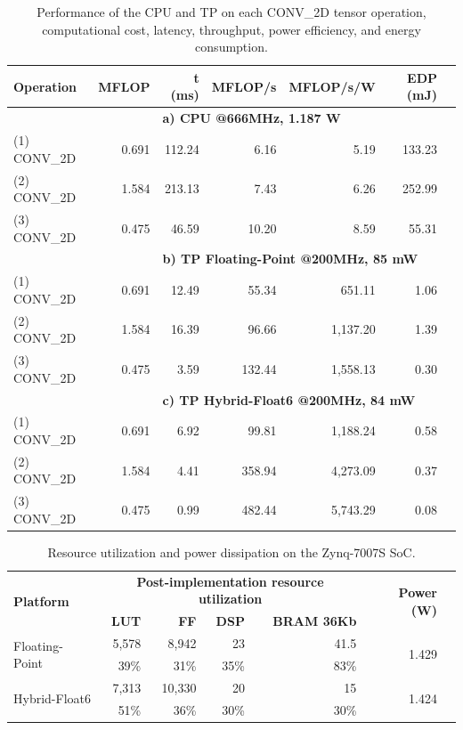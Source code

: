 \begin{table}[!htp]\centering
	\caption{Performance of the CPU and TP on each CONV\_2D tensor operation, computational cost, latency, throughput, power efficiency, and energy consumption.}\label{tab:performance}
	\scriptsize
	\begin{tabular}{lrrrrrr}\toprule
		\textbf{Operation} &\textbf{MFLOP} &\textbf{t (ms)} &\textbf{MFLOP/s} &\textbf{MFLOP/s/W} &\textbf{EDP (mJ)} \\\midrule
		& &\multicolumn{4}{l}{\textbf{a) CPU @666MHz, 1.187 W}} \\
		(1) CONV\_2D &0.691 &112.24 &6.16 &5.19 &133.23 \\
		(2) CONV\_2D &1.584 &213.13 &7.43 &6.26 &252.99 \\
		(3) CONV\_2D &0.475 &46.59 &10.20 &8.59 &55.31 \\
		& &\multicolumn{4}{l}{\textbf{b) TP Floating-Point @200MHz, 85 mW}} \\
		(1) CONV\_2D &0.691 &12.49 &55.34 &651.11 &1.06 \\
		(2) CONV\_2D &1.584 &16.39 &96.66 &1,137.20 &1.39 \\
		(3) CONV\_2D &0.475 &3.59 &132.44 &1,558.13 &0.30 \\
		& &\multicolumn{4}{l}{\textbf{c) TP Hybrid-Float6 @200MHz, 84 mW}} \\
		(1) CONV\_2D &0.691 &6.92 &99.81 &1,188.24 &0.58 \\
		(2) CONV\_2D &1.584 &4.41 &358.94 &4,273.09 &0.37 \\
		(3) CONV\_2D &0.475 &0.99 &482.44 &5,743.29 &0.08 \\
		\bottomrule
	\end{tabular}
\end{table}


\begin{table}[!htp]\centering
	\caption{Resource utilization and power dissipation on the Zynq-7007S SoC.}\label{tab: }
	\scriptsize
	\begin{tabular}{lrrrrrr}\toprule
		\multirow{2}{*}{\textbf{Platform}} &\multicolumn{4}{c}{\textbf{Post-implementation resource utilization}} &\multirow{2}{*}{\textbf{Power (W)}} \\\cmidrule{2-5}
		&\textbf{LUT} &\textbf{FF} &\textbf{DSP} &\textbf{BRAM 36Kb} & \\\midrule
		\multirow{2}{*}{Floating-Point} &5,578 &8,942 &23 &41.5 &\multirow{2}{*}{1.429} \\
		&39\% &31\% &35\% &83\% & \\
		\multirow{2}{*}{Hybrid-Float6} &7,313 &10,330 &20 &15 &\multirow{2}{*}{1.424} \\
		&51\% &36\% &30\% &30\% & \\
		\bottomrule
	\end{tabular}
\end{table}



